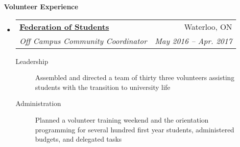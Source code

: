 \documentclass[letterpaper,10pt]{article}
\makeatletter
\newcommand{\resheading}[1]{\colorbox{resBlue}{\begin{minipage}{\textwidth}
			\textbf{#1}
\end{minipage}} \vspace{-14pt}}
\newcommand{\resitem}[4]{\begin{tabular*}{17.5cm}{l@{\extracolsep{\fill}}r} \textbf{#1} & #2 \\ \textit{#3} & \textit{#4} \\ \end{tabular*} \vspace{-6pt}}
\newcommand{\ressubitem}[2]{\begin{tabular*}{17.5cm}{l@{\extracolsep{\fill}}r} \textit{#1} & \textit{#2} \\ \end{tabular*} \vspace{-6pt}}
\makeatother
\begin{document}
\resheading{Volunteer Experience}
\begin{itemize}
\item 
	\resitem{\href{https://feds.ca/}{Federation of Students}}{Waterloo, ON}{Off Campus Community Coordinator}{May 2016 -- Apr. 2017}
		{\footnotesize \begin{description}
				\item[Leadership] Assembled and directed a team of thirty three volunteers assisting students with the transition to university life
				\item[Administration] {Planned a volunteer training weekend and the orientation programming for several hundred first year students, administered budgets, and delegated tasks}
			\end{description}}
		
\begin{comment}\item
	\resitem{\href{http://www.sparkscience.ca/}{TELUS Spark}}{Calgary, AB}{Exhibit Gallery Volunteer}{July 2013 -- Aug. 2013}
		{\footnotesize \begin{description}
			\item[Customer Service] Interacted with visitors to the TELUS Spark Science Centre by explaining the scientific concepts behind a variety of exhibits; adapted interactions to suit customers of all ages and knowledge levels to provide a captivating visitor experience
		\end{description}}
\end{comment}
\end{itemize}
\end{document}
